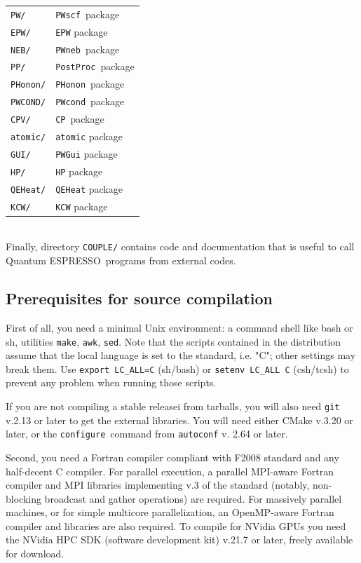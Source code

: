 \documentclass[12pt,a4paper]{article}
\def\qe{{\sc Quantum ESPRESSO}}
\def\configure{\texttt{configure}}
\def\PWscf{\texttt{PWscf}}
\def\PHonon{\texttt{PHonon}}
\def\CP{\texttt{CP}}
\def\PostProc{\texttt{PostProc}}
\def\NEB{\texttt{PWneb}}
\def\make{\texttt{make}}
\begin{document}
\begin{tabular}{ll}
\texttt{PW/}      & \PWscf\ package\\
\texttt{EPW/}     & \texttt{EPW} package\\
\texttt{NEB/}     & \NEB\ package\\
\texttt{PP/}      & \PostProc\ package\\
\texttt{PHonon/}  & \PHonon\ package\\
\texttt{PWCOND/}  & \texttt{PWcond}\ package\\
\texttt{CPV/}     & \CP\ package\\
\texttt{atomic/}  & \texttt{atomic} package\\
\texttt{GUI/}     & \texttt{PWGui} package\\
\texttt{HP/}      & \texttt{HP} package\\
\texttt{QEHeat/}  & \texttt{QEHeat} package\\
\texttt{KCW/}     & \texttt{KCW} package
\end{tabular}
\\

Finally, directory \texttt{COUPLE/} contains code and documentation
that is useful to call \qe\ programs from external codes.

\subsection{Prerequisites for source compilation}
\label{Sec:Installation}

First of all, you need a minimal Unix environment: a command shell 
like bash or sh, utilities \make, \texttt{awk}, \texttt{sed}. 
Note that the scripts contained in the distribution 
assume that the local  language is set to the standard, i.e. "C"; 
other settings may break them. Use \texttt{export LC\_ALL=C} (sh/bash) 
or \texttt{setenv LC\_ALL C} (csh/tcsh) to prevent any problem
when running those scripts.

If you are not compiling a stable releasei from tarballs,
you will also need \texttt{git} v.2.13 or later to get the 
external libraries.
You will need either CMake v.3.20 or later, or the \configure\ 
command from \texttt{autoconf} v. 2.64 or later.

Second, you need a Fortran compiler compliant with F2008 standard
and any half-decent C compiler.
For parallel execution, a parallel MPI-aware Fortran compiler 
and MPI libraries implementing v.3 of the standard (notably, 
non-blocking broadcast and gather operations) are required.
For massively parallel machines, or for simple multicore parallelization, 
an OpenMP-aware Fortran compiler and libraries are also required. 
To compile 
for NVidia GPUs you need the NVidia HPC SDK (software development kit) 
v.21.7 or later, freely available for download.
\end{document}
